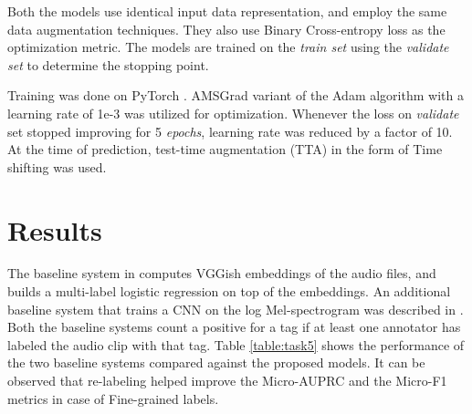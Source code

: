\documentclass{article}
\begin{document}
\begin{sloppy}
Both the models use identical input data representation, and employ the same data augmentation techniques. They also use Binary Cross-entropy loss as the optimization metric. The models are trained on the \textit{train set} using the \textit{validate set} to determine the stopping point.

Training was done on PyTorch \cite{paszke2017automatic}. AMSGrad variant of the Adam algorithm \cite{kingma2014adam, reddi2019convergence} with a learning rate of 1e-3 was utilized for optimization. Whenever the loss on \textit{validate} set stopped improving for 5 \textit{epochs}, learning rate was reduced by a factor of 10. At the time of prediction, test-time augmentation (TTA) in the form of Time shifting was used.

\section{Results}
\label{sec:results}

The baseline system in \cite{dcase2019task5} computes VGGish embeddings \cite{hershey2017cnn} of the audio files, and builds a multi-label logistic regression on top of the embeddings. An additional baseline system that trains a CNN on the log Mel-spectrogram was described in \cite{kong2019cross}. Both the baseline systems count a positive for a tag if at least one annotator has labeled the audio clip with that tag. Table \ref{table:task5} shows the performance of the two baseline systems compared against the proposed models. It can be observed that re-labeling helped improve the Micro-AUPRC and the Micro-F1 metrics in case of Fine-grained labels.


\end{sloppy}
\end{document}
